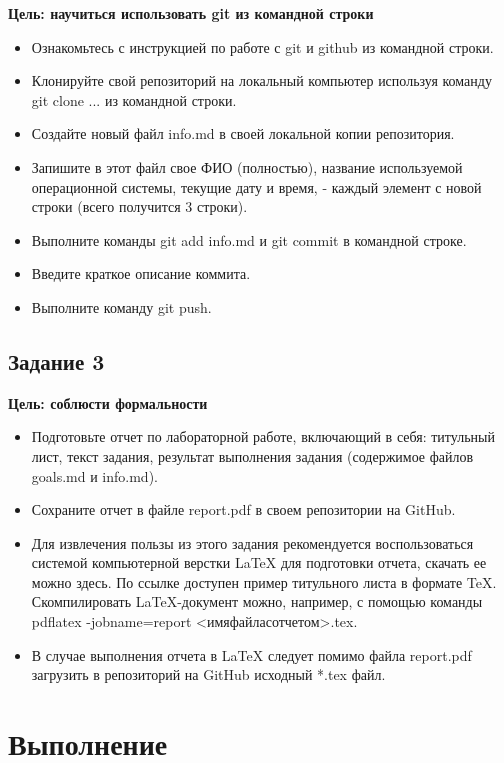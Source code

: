 \documentclass[12pt]{article}
\begin{document}
		\textbf{Цель: научиться использовать git из командной строки}
		
		\begin{itemize}
			\item Ознакомьтесь с инструкцией по работе с git и github из командной строки.
			\item Клонируйте свой репозиторий на локальный компьютер используя команду git clone ... из командной строки.
			\item Создайте новый файл info.md в своей локальной копии репозитория.
			\item Запишите в этот файл свое ФИО (полностью), название используемой операционной системы, текущие дату и время, - каждый элемент с новой строки (всего получится 3 строки).
			\item Выполните команды git add info.md и git commit в командной строке.
			\item Введите краткое описание коммита.
			\item Выполните команду git push.
		\end{itemize}
		
		
		\subsection{Задание 3}
		
		\textbf{Цель: соблюсти формальности}
		
		\begin{itemize}
			\item Подготовьте отчет по лабораторной работе, включающий в себя: титульный лист, текст задания, результат выполнения задания (содержимое файлов goals.md и info.md).
			\item Сохраните отчет в файле report.pdf в своем репозитории на GitHub.
			\item Для извлечения пользы из этого задания рекомендуется воспользоваться системой компьютерной верстки LaTeX для подготовки отчета, скачать ее можно здесь. По ссылке доступен пример титульного листа в формате TeX. Скомпилировать LaTeX-документ можно, например, с помощью команды pdflatex -jobname=report <имяфайласотчетом>.tex.
			\item В случае выполнения отчета в LaTeX следует помимо файла report.pdf загрузить в репозиторий на GitHub исходный *.tex файл.
		\end{itemize}
		
		\newpage
		
		\section{Выполнение}
		
\end{document}
